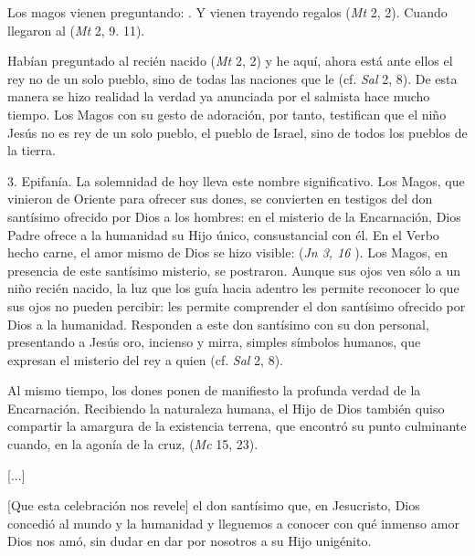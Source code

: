 \begin{body}
	Los magos vienen preguntando: . Y vienen trayendo regalos (\emph{Mt} 2, 2). Cuando llegaron al  (\emph{Mt} 2, 9. 11).
	
	Habían preguntado al recién nacido  (\emph{Mt} 2, 2) y he aquí, ahora está ante ellos el rey no de un solo pueblo, sino de todas las naciones que le  (cf. \emph{Sal} 2, 8). De esta manera se hizo realidad la verdad ya anunciada por el salmista hace mucho tiempo. Los Magos con su gesto de adoración, por tanto, testifican que el niño Jesús no es rey de un solo pueblo, el pueblo de Israel, sino de todos los pueblos de la tierra.
	
	3. Epifanía. La solemnidad de hoy lleva este nombre significativo. Los Magos, que vinieron de Oriente para ofrecer sus dones, se convierten en testigos del don santísimo ofrecido por Dios a los hombres: en el misterio de la Encarnación, Dios Padre ofrece a la humanidad su Hijo único, consustancial con él. En el Verbo hecho carne, el amor mismo de Dios se hizo visible:  (\emph{Jn 3, 16} ). Los Magos, en presencia de este santísimo misterio, se postraron. Aunque sus ojos ven sólo a un niño recién nacido, la luz que los guía hacia adentro les permite reconocer lo que sus ojos no pueden percibir: les permite comprender el don santísimo ofrecido por Dios a la humanidad. Responden a este don santísimo con su don personal, presentando a Jesús oro, incienso y mirra, simples símbolos humanos, que expresan el misterio del rey a quien  (cf. \emph{Sal} 2, 8).
	
	Al mismo tiempo, los dones ponen de manifiesto la profunda verdad de la Encarnación. Recibiendo la naturaleza humana, el Hijo de Dios también quiso compartir la amargura de la existencia terrena, que encontró su punto culminante cuando, en la agonía de la cruz,  (\emph{Mc} 15, 23).
	
	{[}...{]}
	
	{[}Que esta celebración nos revele{]} el don santísimo que, en Jesucristo, Dios concedió al mundo y la humanidad y lleguemos a conocer con qué inmenso amor Dios nos amó, sin dudar en dar por nosotros a su Hijo unigénito.
	

\end{body}
